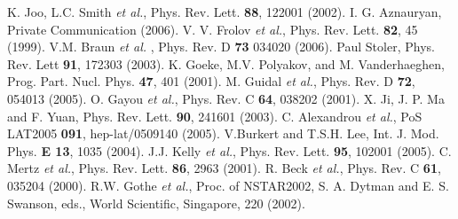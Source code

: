 \documentclass[aps,prl,twocolumn,superscriptaddress]{revtex4}
\begin{document}
\begin{thebibliography}{99}
           {K. Joo, L.C. Smith {\it et al.}},                       {\aaa Phys. Rev. Lett.  }        {\bf 88},            122001   (2002).
       {I. G. Aznauryan},                                       {\aaa Private Communication  }                                 (2006).
            {V. V. Frolov {\it et al.}},                             {\aaa Phys. Rev. Lett.  }        {\bf 82},                45   (1999).
     {V.M. Braun  {\it et al.} },                             {\aaa Phys. Rev.        }      D {\bf 73}             034020   (2006).   
      {Paul Stoler},                                           {\aaa Phys. Rev. Lett   }        {\bf 91},            172303   (2003).
         {K. Goeke, M.V. Polyakov, and M. Vanderhaeghen},         {\aaa Prog. Part. Nucl. Phys.}   {\bf 47},               401   (2001).
        {M. Guidal {\it et al.}},                                {\aaa Phys. Rev.        }      D {\bf 72},            054013   (2005).
         {O. Gayou {\it et al.}},                                 {\aaa Phys. Rev.        }      C {\bf 64},            038202   (2001).
           {X. Ji, J. P. Ma and F. Yuan},                           {\aaa Phys. Rev. Lett.  }        {\bf 90},            241601   (2003).
              {C. Alexandrou {\it et al.}},                            {\aaa PoS LAT2005       }        {\bf 091},   hep-lat/0509140  (2005).
          {V.Burkert and T.S.H. Lee},                              {\aaa Int. J. Mod. Phys. }       {\bf E 13},            1035   (2004).
            {J.J. Kelly {\it et al.}},                               {\aaa Phys. Rev. Lett.  }        {\bf 95},            102001   (2005).
             {C. Mertz {\it et al.}},                                 {\aaa Phys. Rev. Lett.  }        {\bf 86},              2963   (2001).
              {R. Beck {\it et al.}},                                  {\aaa Phys. Rev.        }      C {\bf 61},            035204   (2000).
              {R.W. Gothe {\it et al.}},                               {\aaa Proc. of NSTAR2002}, S. A. Dytman and E. S. Swanson, eds., World Scientific, Singapore,   220   (2002).
\end{thebibliography}
\end{document}
